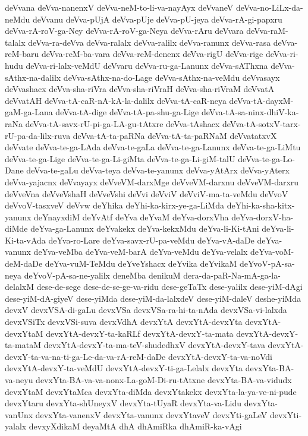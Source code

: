{deVvana
deVva-nanenxV
deVva-neM-to-li-va-nayAyx
deVvaneV
deVva-no-LiLx-da-neMdu
deVvanu
deVva-pUjA
deVva-pUje
deVva-pU-jeya
deVva-rA-gi-papxru
deVva-rA-roV-ga-Ney
deVva-rA-roV-ga-Neya
deVva-rAru
deVvara
deVva-raM-talalx
deVva-ra-deVva
deVva-ralalx
deVva-ralilx
deVva-ranunx
deVva-rasa
deVva-reM-baru
deVva-reM-ba-vara
deVva-reM-denenx
deVva-rigU
deVva-rige
deVva-ri-hudu
deVva-ri-lalx-veMdU
deVvaru
deVva-ru-ga-Lanunx
deVva-sAThxna
deVva-sAthx-na-dalilx
deVva-sAthx-na-do-Lage
deVva-sAthx-na-veMdu
deVvasayx
deVvashacx
deVva-sha-riVra
deVva-sha-riVraH
deVva-sha-riVraM
deVvatA
deVvatAH
deVva-tA-caR-nA-kA-la-dalilx
deVva-tA-caR-neya
deVva-tA-dayxM-gaM-ga-Lana
deVva-tA-dige
deVva-tA-pa-shu-ga-Lige
deVva-tA-sa-ninx-dhiV-ka-raNa
deVva-tA-savx-rU-pi-ga-LA-gu-tAtxre
deVva-tAshacx
deVva-tA-sotxV-tarx-rU-pa-da-lilx-ruva
deVva-tA-ta-paRNa
deVva-tA-ta-paRNaM
deVvatatxvX
deVvate
deVva-te-ga-LAda
deVva-te-gaLa
deVva-te-ga-Lanunx
deVva-te-ga-LiMtu
deVva-te-ga-Lige
deVva-te-ga-Li-giMta
deVva-te-ga-Li-giM-talU
deVva-te-ga-Lo-Dane
deVva-te-gaLu
deVva-teya
deVva-te-yanunx
deVva-yAtArx
deVva-yAterx
deVva-yajacnx
deVvayayx
deVveVM-darxMge
deVveVM-darxnu
deVveVM-darxru
deVveVna
deVveVshaH
deVveVshi
deVvi
deVviV
deVviV-ma-ta-veMdu
deVvoV
deVvoV-tasxveV
deVvw
deYhika
deYhi-ka-kirx-ye-ga-LiMda
deYhi-ka-sha-kitx-yanunx
deYnayxdiM
deYvAtf
deYva
deYvaM
deYva-dorxVha
deYva-dorxV-ha-diMde
deYva-ga-Lanunx
deYvakekx
deYva-kekxMdu
deYva-li-Ki-tAni
deYva-li-Ki-ta-vAda
deYva-ro-Lare
deYva-savx-rU-pa-veMdu
deYva-vA-daDe
deYva-vanunx
deYva-veMba
deYva-veM-barA
deYva-veMdu
deYva-velalx
deYva-voM-deM-daDe
deYva-vuM-TeMdu
deYveYshacx
deYvika
deYvikaM
deYvoV-pA-sa-neya
deYvoV-pA-sa-ne-yalilx
deneMba
denikuM
dera-da-paR-Na-mA-ga-la-delalxM
dese-de-sege
dese-de-se-ge-va-ridu
dese-geTaTx
dese-yalilx
dese-yiM-dAgi
dese-yiM-dA-giyeV
dese-yiMda
dese-yiM-da-lalxdeV
dese-yiM-daleV
deshe-yiMda
devxV
devxVSA-di-gaLu
devxVSa
devxVSa-ra-hi-ta-nAda
devxVSa-vi-lalxda
devxVSiTx
devxVSi-suva
devxVdhA
devxYtA
devxYtA-devxYta
devxYtA-devxYtaM
devxYtA-devxY-ta-kaRLf
devxYtA-devxY-ta-mata
devxYtA-devxY-ta-mataM
devxYtA-devxY-ta-ma-teV-shudedhxV
devxYtA-devxY-tava
devxYtA-devxY-ta-va-na-ti-ga-Le-da-va-rA-reM-daDe
devxYtA-devxY-ta-va-noVdi
devxYtA-devxY-ta-veMdU
devxYtA-devxY-ti-ga-Lelalx
devxYta
devxYta-BA-va-neyu
devxYta-BA-va-va-nonx-La-goM-Di-ru-tAtxne
devxYta-BA-va-vidudx
devxYtaM
devxYtaMca
devxYta-diMda
devxYtakekx
devxYta-la-ya-ve-ni-pude
devxYtaru
devxYta-shUneyxV
devxYta-tUyaR
devxYta-va-Lidu
devxYta-vanUnx
devxYta-vanenxV
devxYta-vanunx
devxYtaveV
devxYti-gaLeV
devxYti-yalalx
devxyXdikaM
deyaMtA
dhA
dhAmiRka
dhAmiR-ka-vAgi
}
